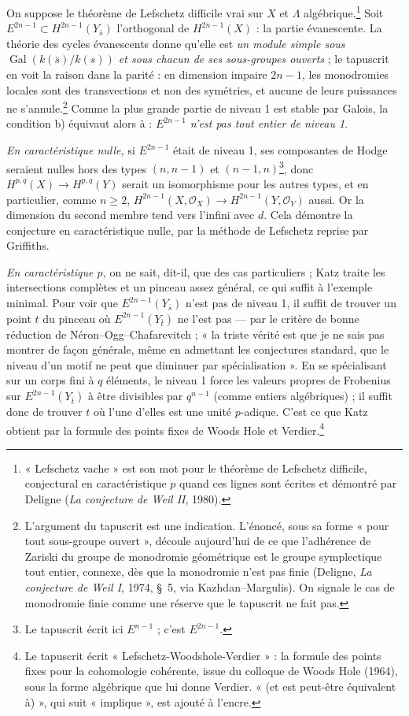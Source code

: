 \documentclass[11pt,a4paper]{article}
\begin{document}
On suppose le théorème de Lefschetz difficile vrai sur $X$ et $\Lambda$
algébrique.\footnote{« Lefschetz vache » est son mot pour le théorème de
Lefschetz difficile, conjectural en caractéristique $p$ quand ces lignes sont
écrites et démontré par Deligne (\emph{La conjecture de Weil II}, 1980).} Soit
$E^{2n-1} \subset H^{2n-1}(Y_{\bar s})$ l'orthogonal de $H^{2n-1}(X)$ : la
partie évanescente. La théorie des cycles évanescents donne qu'elle est
\emph{un module simple sous $\operatorname{Gal}(k(\bar s)/k(s))$ et sous chacun
de ses sous-groupes ouverts} ; le tapuscrit en voit la raison dans la parité :
en dimension impaire $2n-1$, les monodromies locales sont des transvections et
non des symétries, et aucune de leurs puissances ne s'annule.\footnote{L'argument
du tapuscrit est une indication. L'énoncé, sous sa forme « pour tout sous-groupe
ouvert », découle aujourd'hui de ce que l'adhérence de Zariski du groupe de
monodromie géométrique est le groupe symplectique tout entier, connexe, dès que
la monodromie n'est pas finie (Deligne, \emph{La conjecture de Weil I}, 1974,
§~5, via Kazhdan--Margulis). On signale le cas de monodromie finie comme une
réserve que le tapuscrit ne fait pas.} Comme la plus grande partie de niveau 1
est stable par Galois, la condition b) équivaut alors à : \emph{$E^{2n-1}$ n'est
pas tout entier de niveau 1}.

\emph{En caractéristique nulle,} si $E^{2n-1}$ était de niveau 1, ses
composantes de Hodge seraient nulles hors des types $(n, n-1)$ et $(n-1,
n)$\footnote{Le tapuscrit écrit ici $E^{n-1}$ ; c'est $E^{2n-1}$.}, donc
$H^{p,q}(X) \to H^{p,q}(Y)$ serait un isomorphisme pour les autres types, et en
particulier, comme $n \geqslant 2$, $H^{2n-1}(X, \mathcal{O}_X) \to
H^{2n-1}(Y, \mathcal{O}_Y)$ aussi. Or la dimension du second membre tend vers
l'infini avec $d$. Cela démontre la conjecture en caractéristique nulle, par la
méthode de Lefschetz reprise par Griffiths.

\emph{En caractéristique $p$,} on ne sait, dit-il, que des cas particuliers ;
Katz traite les intersections complètes et un pinceau assez général, ce qui suffit
à l'exemple minimal. Pour voir que $E^{2n-1}(Y_{\bar s})$ n'est pas de niveau 1, il
suffit de trouver un point $t$ du pinceau où $E^{2n-1}(Y_{\bar t})$ ne l'est pas ---
par le critère de bonne réduction de Néron--Ogg--Chafarevitch ; « la triste vérité
est que je ne sais pas montrer de façon générale, même en admettant les
conjectures standard, que le niveau d'un motif ne peut que diminuer par
spécialisation ». En se spécialisant sur un corps fini à $q$ éléments, le niveau 1
force les valeurs propres de Frobenius sur $E^{2n-1}(Y_{\bar t})$ à être divisibles
par $q^{n-1}$ (comme entiers algébriques) ; il suffit donc de trouver $t$ où l'une
d'elles est une unité $p$-adique. C'est ce que Katz obtient par la formule des
points fixes de Woods Hole et Verdier.\footnote{Le tapuscrit écrit
« Lefschetz-Woodshole-Verdier » : la formule des points fixes pour la cohomologie
cohérente, issue du colloque de Woods Hole (1964), sous la forme algébrique que
lui donne Verdier. « (et est peut-être équivalent à) », qui suit « implique »,
est ajouté à l'encre.}
\end{document}
